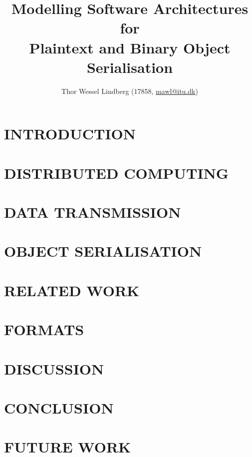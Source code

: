 \documentclass[10pt, twocolumn, letterpaper]{article}
\title{
    \vspace{-0.5cm}
    \huge \textbf{Modelling Software Architectures for}  \\
    \huge \textbf{Plaintext and Binary Object Serialisation}  \\
}
\author{Thor Wessel Lindberg (17858, \href{mailto:mawl@itu.dk}{mawl@itu.dk})}
\date{}
\begin{document}
\maketitle



\section{INTRODUCTION}


\section{DISTRIBUTED COMPUTING} %


\section{DATA TRANSMISSION} %


\section{OBJECT SERIALISATION} %


% 

\section{RELATED WORK} %


\section{FORMATS} %


\section{DISCUSSION}


\section{CONCLUSION}


\section{FUTURE WORK}



\end{document}
